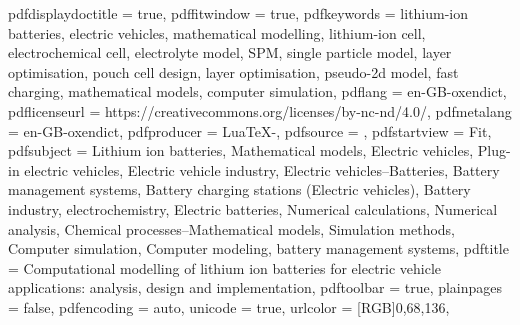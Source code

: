 {    pdfdisplaydoctitle = true,
    pdffitwindow       = true,
    pdfkeywords        = {lithium-ion batteries, electric vehicles, mathematical modelling, lithium-ion cell, electrochemical cell, electrolyte model, SPM, single particle model, layer optimisation, pouch cell design, layer optimisation, pseudo-2d model, fast charging, mathematical models, computer simulation},
    pdflang            = {en-GB-oxendict},
    pdflicenseurl      = {https://creativecommons.org/licenses/by-nc-nd/4.0/},
    pdfmetalang        = {en-GB-oxendict},
    pdfproducer        = {LuaTeX-\luatexversionused},
    pdfsource          = {},
    pdfstartview       = {Fit},
    pdfsubject         = {Lithium ion batteries, Mathematical models, Electric vehicles, Plug-in electric vehicles, Electric vehicle industry, Electric vehicles--Batteries, Battery management systems, Battery charging stations (Electric vehicles), Battery industry, electrochemistry, Electric batteries, Numerical calculations, Numerical analysis, Chemical processes--Mathematical models, Simulation methods, Computer simulation, Computer modeling, battery management systems},
    pdftitle           = {Computational modelling of lithium ion batteries for electric vehicle applications: analysis, design and implementation},
    pdftoolbar         = true,
    plainpages         = false,
    pdfencoding        = auto,
    unicode            = true,
    urlcolor           = [RGB]{0,68,136}, %
}%



\usepackage{nameref}
\usepackage{algorithm} %
\usepackage{hypcap} %

\usepackage{pdftexcmds} %

\usepackage{glossaries-extra} %

\usepackage{hypdestopt} %

\usepackage{bookmark} %
\usepackage{cleveref}

\newcommand{\blackurl}{\hypersetup{urlcolor=black}}%
\newcommand{\regularurl}{\hypersetup{urlcolor=[RGB]{0,68,136}}}%

